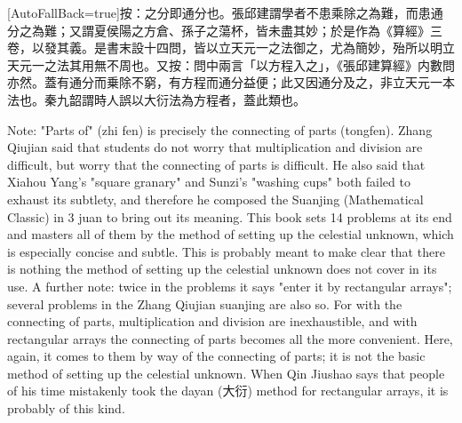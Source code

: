\documentclass[11pt]{article}
\newcommand{\unitlabel}[1]{\marginpar{\raggedleft\tiny\color{gray}#1}}
\newenvironment{unitzh}{\par\CJKfontspec{Noto Serif CJK SC}[AutoFallBack=true]\large\linespread{1.25}\selectfont}{\par}
\newenvironment{uniten}{\par\small\color{black!85}}{\par\medskip}
\begin{document}
\begin{unitzh}\unitlabel{ceyuan-033.19}按：之分即通分也。張邱建謂學者不患乘除之為難，而患通分之為難；又謂夏侯陽之方倉、孫子之蕩杯，皆未盡其妙；於是作為《算經》三卷，以發其義。是書末設十四問，皆以立天元一之法御之，尤為簡妙，殆所以明立天元一之法其用無不周也。又按：問中兩言「以方程入之」，《張邱建算經》内數問亦然。蓋有通分而乗除不窮，有方程而通分益便；此又因通分及之，非立天元一本法也。秦九韶謂時人誤以大衍法為方程者，蓋此類也。\end{unitzh}
\begin{uniten}Note: "Parts of" (zhi fen) is precisely the connecting of parts (tongfen). Zhang Qiujian said that students do not worry that multiplication and division are difficult, but worry that the connecting of parts is difficult. He also said that Xiahou Yang's "square granary" and Sunzi's "washing cups" both failed to exhaust its subtlety, and therefore he composed the Suanjing (Mathematical Classic) in 3 juan to bring out its meaning. This book sets 14 problems at its end and masters all of them by the method of setting up the celestial unknown, which is especially concise and subtle. This is probably meant to make clear that there is nothing the method of setting up the celestial unknown does not cover in its use. A further note: twice in the problems it says "enter it by rectangular arrays"; several problems in the Zhang Qiujian suanjing are also so. For with the connecting of parts, multiplication and division are inexhaustible, and with rectangular arrays the connecting of parts becomes all the more convenient. Here, again, it comes to them by way of the connecting of parts; it is not the basic method of setting up the celestial unknown. When Qin Jiushao says that people of his time mistakenly took the dayan (大衍) method for rectangular arrays, it is probably of this kind.\end{uniten}
\end{document}
